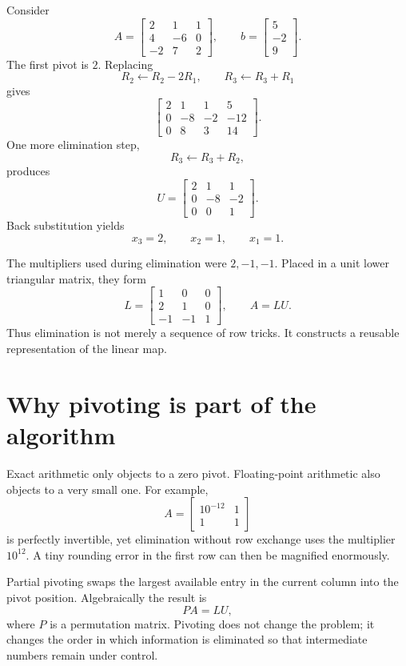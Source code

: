 Consider
\[
  A=
  \begin{bmatrix}
    2&1&1\\
    4&-6&0\\
    -2&7&2
  \end{bmatrix},
  \qquad
  b=
  \begin{bmatrix}
    5\\-2\\9
  \end{bmatrix}.
\]
The first pivot is \(2\).  Replacing
\[
  R_2\leftarrow R_2-2R_1,
  \qquad
  R_3\leftarrow R_3+R_1
\]
gives
\[
  \left[
  \begin{array}{ccc|c}
    2&1&1&5\\
    0&-8&-2&-12\\
    0&8&3&14
  \end{array}
  \right].
\]
One more elimination step,
\[
  R_3\leftarrow R_3+R_2,
\]
produces
\[
  U=
  \begin{bmatrix}
    2&1&1\\
    0&-8&-2\\
    0&0&1
  \end{bmatrix}.
\]
Back substitution yields
\[
  x_3=2,\qquad x_2=1,\qquad x_1=1.
\]

The multipliers used during elimination were \(2,-1,-1\).  Placed in a unit lower triangular matrix, they form
\[
  L=
  \begin{bmatrix}
    1&0&0\\
    2&1&0\\
    -1&-1&1
  \end{bmatrix},
  \qquad A=LU.
\]
Thus elimination is not merely a sequence of row tricks.  It constructs a reusable representation of the linear map.

\section{Why pivoting is part of the algorithm}

Exact arithmetic only objects to a zero pivot.  Floating-point arithmetic also objects to a very small one.  For example,
\[
  A=
  \begin{bmatrix}
    10^{-12}&1\\
    1&1
  \end{bmatrix}
\]
is perfectly invertible, yet elimination without row exchange uses the multiplier \(10^{12}\).  A tiny rounding error in the first row can then be magnified enormously.

Partial pivoting swaps the largest available entry in the current column into the pivot position.  Algebraically the result is
\[
  PA=LU,
\]
where \(P\) is a permutation matrix.  Pivoting does not change the problem; it changes the order in which information is eliminated so that intermediate numbers remain under control.

